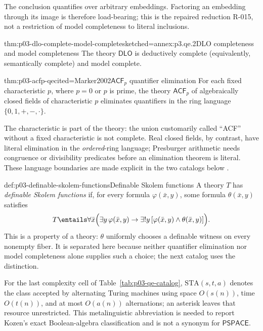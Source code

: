 The conclusion quantifies over arbitrary embeddings.  Factoring an embedding
through its image is therefore load-bearing; this is the repaired reduction
R-015, not a restriction of model completeness to literal inclusions.

\begin{hbcorollary}{thm:p03-dlo-complete-model-complete}{sketched=annex:p3.qe.2}{DLO completeness and model completeness}
The theory \(\mathsf{DLO}\) is deductively complete (equivalently,
semantically complete) and model complete.
\end{hbcorollary}

\begin{hbtheorem}{thm:p03-acfp-qe}{cited=Marker2002}{\(\mathsf{ACF}_p\) quantifier elimination}
For each fixed characteristic \(p\), where \(p=0\) or \(p\) is prime, the
theory \(\mathsf{ACF}_p\) of algebraically closed fields of characteristic
\(p\) eliminates quantifiers in the ring language
\(\{0,1,+,-,\mathbin{\cdot}\}\).
\end{hbtheorem}

The characteristic is part of the theory: the union customarily called
``ACF'' without a fixed characteristic is not complete.  Real closed fields,
by contrast, have literal elimination in the \emph{ordered}-ring language;
Presburger arithmetic needs congruence or divisibility predicates before an
elimination theorem is literal.  These language boundaries are made explicit
in the two catalogs below \cite{Marker2002,Presburger1929}.

\begin{hbdefinition}{def:p03-definable-skolem-functions}{Definable Skolem functions}
A theory \(T\) has \emph{definable Skolem functions} if, for every formula
\(\varphi(\bar x,y)\), some formula \(\theta(\bar x,y)\) satisfies
\[
 T\entails\forall\bar x\Bigl(
   \exists y\,\varphi(\bar x,y)\to
   \exists!y\,[\varphi(\bar x,y)\land\theta(\bar x,y)]\Bigr).
\]
This is a property of a theory: \(\theta\) uniformly chooses a definable
witness on every nonempty fiber.  It is separated here because neither
quantifier elimination nor model completeness alone supplies such a choice;
the next catalog uses the distinction.
\end{hbdefinition}

For the last complexity cell of Table~\ref{tab:p03-qe-catalog},
\(\mathrm{STA}(s,t,a)\) denotes the class accepted by alternating Turing
machines using space \(O(s(n))\), time \(O(t(n))\), and at most \(O(a(n))\)
alternations; an asterisk leaves that resource unrestricted.  This
metalinguistic abbreviation is needed to report Kozen's exact Boolean-algebra
classification and is not a synonym for \(\mathsf{PSPACE}\).

